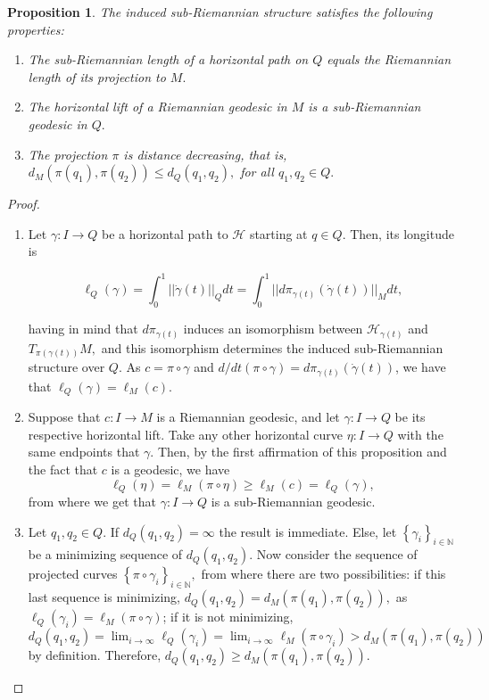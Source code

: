 \documentclass[12pt, letterpaper, reqno]{amsart}
\theoremstyle{definition}
\theoremstyle{plain}
\newtheorem{prop}{Proposition}
\theoremstyle{remark}
\begin{document}
\begin{prop}
	The induced sub-Riemannian structure satisfies the following properties:
	\begin{enumerate}
		\item The sub-Riemannian length of a horizontal path on $ Q $ equals the Riemannian length of its projection to $ M. $ 
		\item The horizontal lift of a Riemannian geodesic in $ M $ is a sub-Riemannian geodesic in $ Q. $ 
		\item The projection $ \pi $ is distance decreasing, that is, $ d_M(\pi(q_1), \pi(q_2))\leq d_Q(q_1,q_2), $ for all $ q_1,q_2\in Q. $ 
	\end{enumerate}
\end{prop}
\begin{proof}
	\begin{enumerate}
		\item Let $ \gamma: I \rightarrow {Q} $ be a horizontal path to $ \mathcal{H} $ starting at $ q\in Q. $ Then, its longitude is 

		$$\ell_Q(\gamma) = \int_0^1 ||\dot{\gamma} (t) ||_{Q} dt = \int_0^1 || d\pi_{\gamma(t)}(\dot{\gamma}(t))||_M dt,$$ 

		having in mind that $d\pi_{\gamma(t)}$ induces an isomorphism between $ \mathcal{H}_{\gamma(t)} $ and $ T_{\pi(\gamma(t))} M,$ and this isomorphism determines the induced sub-Riemannian structure over $ Q. $ As $c=\pi\circ\gamma$ and $ d/dt(\pi\circ\gamma) = d\pi_{\gamma(t)}(\dot{\gamma}(t)) $, we have that $ \ell_Q(\gamma)=\ell_M(c). $  

		\item Suppose that $ c: I \rightarrow {M} $ is a Riemannian geodesic, and let $ \gamma: I \rightarrow {Q} $ be its respective horizontal lift. Take any other horizontal curve $ \eta: I \rightarrow {Q} $ with the same endpoints that $ \gamma. $ Then, by the first affirmation of this proposition and the fact that $ c $ is a geodesic, we have
			$$ \ell_Q(\eta) = \ell_M(\pi\circ \eta) \geq \ell_M(c) = \ell_Q(\gamma),  $$ 
		from where we get that $ \gamma: I \rightarrow {Q} $ is a sub-Riemannian geodesic.

	\item Let $ q_1,q_2\in Q. $ If $ d_Q(q_1,q_2) = \infty $ the result is immediate. Else, let $ \left\{ \gamma_i \right\}_{i\in \mathbb{N}} $ be a minimizing sequence of $ d_Q(q_1,q_2). $ Now consider the sequence of projected curves $ \left\{ \pi\circ\gamma_i \right\}_{i\in \mathbb{N}}, $ from where there are two possibilities: if this last sequence is minimizing, $ d_Q(q_1, q_2) = d_M(\pi(q_1), \pi(q_2)),$ as $ \ell_Q(\gamma_i)=\ell_M(\pi\circ\gamma) $;  if it is not minimizing,  $d_Q(q_1,q_2) = \lim_{i \rightarrow \infty} \ell_Q(\gamma_i) = \lim_{i \rightarrow \infty} \ell_M(\pi\circ\gamma_i) > d_M(\pi(q_1),\pi(q_2))$ by definition. Therefore, $ d_Q(q_1,q_2)\geq d_M(\pi(q_1),\pi(q_2)).$
	\end{enumerate}
\end{proof}
\end{document}
